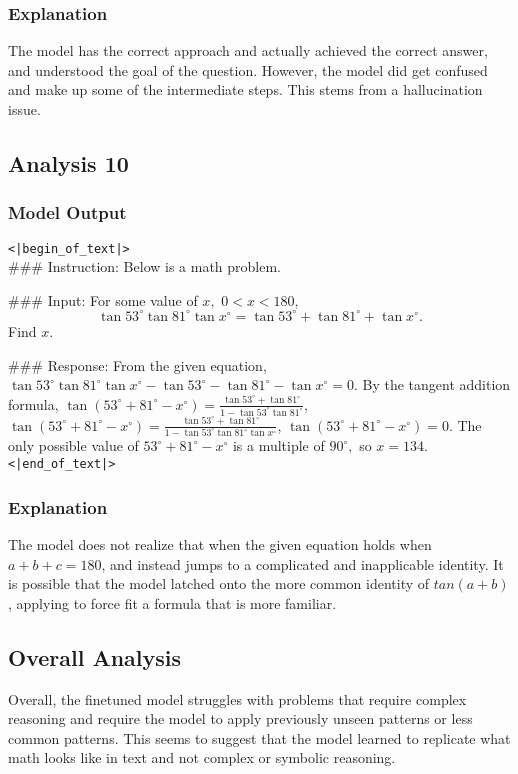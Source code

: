 \subsubsection{Explanation}
The model has the correct approach and actually achieved the correct answer, and understood the goal of the question. However, the model did get confused and make up some of the intermediate steps. This stems from a hallucination issue.

\subsection{Analysis 10}
\subsubsection{Model Output}
\texttt{<|begin\_of\_text|>} \\

\#\#\# Instruction: Below is a math problem.

\#\#\# Input: For some value of $x,$ $0 < x < 180,$\[\tan 53^\circ \tan 81^\circ \tan x^\circ = \tan 53^\circ + \tan 81^\circ + \tan x^\circ.\]Find $x.$ 

\#\#\# Response: From the given equation,
$\tan 53^\circ \tan 81^\circ \tan x^\circ - \tan 53^\circ - \tan 81^\circ - \tan x^\circ = 0.$ By the tangent addition formula, $\tan (53^\circ + 81^\circ - x^\circ) = \frac{\tan 53^\circ + \tan 81^\circ}{1 - \tan 53^\circ \tan 81^\circ}$, $\tan (53^\circ + 81^\circ - x^\circ) = \frac{\tan 53^\circ + \tan 81^\circ}{1 - \tan 53^\circ \tan 81^\circ \tan x^\circ}$,  
$\tan (53^\circ + 81^\circ - x^\circ)= 0$. The only possible value of $53^\circ + 81^\circ - x^\circ$ is a multiple of $90^\circ,$ so $x = \boxed{134}.$
\\\texttt{<|end\_of\_text|>}

\subsubsection{Explanation}
The model does not realize that when the given equation holds when $a+b+c=180$, and instead jumps to a complicated and inapplicable identity. It is possible that the model latched onto the more common identity of $tan(a+b)$, applying to force fit a formula that is more familiar. 

\subsection{Overall Analysis}
Overall, the finetuned model struggles with problems that require complex reasoning and require the model to apply previously unseen patterns or less common patterns. This seems to suggest that the model learned to replicate what math looks like in text and not complex or symbolic reasoning. 